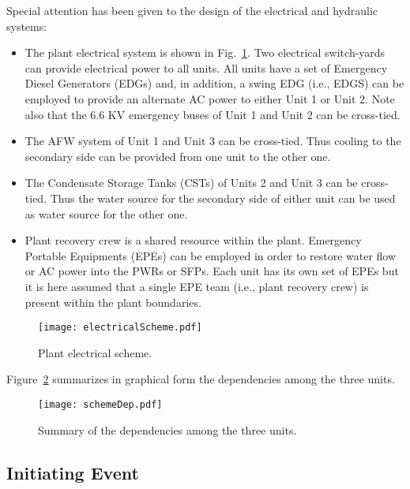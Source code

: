 Special attention has been given to the design of the electrical and hydraulic systems:
\begin{itemize}
  \item The plant electrical system is shown in Fig.~\ref{fig:electricalScheme}. Two 
        electrical switch-yards can provide electrical power to all units. All units 
        have a set of Emergency Diesel Generators (EDGs)  and, in addition, a swing 
        EDG (i.e., EDGS) can be employed to provide an alternate AC power to either
        Unit 1 or Unit 2. Note also that the 6.6 KV emergency buses of Unit 1 and 
        Unit 2 can be cross-tied.
  \item The AFW system of Unit 1 and Unit 3 can be cross-tied. 
        Thus cooling to the secondary side can be provided from one unit to the other one.
  \item The Condensate Storage Tanks (CSTs) of Units 2 and Unit 3 can be cross-tied. 
        Thus the water source  for the secondary side of either unit can be used as
        water source for the other one. 
  \item Plant recovery crew is a shared resource within the plant. Emergency Portable Equipments 
        (EPEs) can be employed in order
        to restore water flow or AC power into the PWRs or SFPs. Each unit has its own 
        set of EPEs but it is here assumed that a single EPE team (i.e., plant recovery 
        crew) is present within the plant boundaries.
\end{itemize}

\begin{figure}
    \centering
    \centerline{\texttt{[image: electricalScheme.pdf]}}
    \caption{Plant electrical scheme.}
    \label{fig:electricalScheme}
\end{figure}

Figure~\ref{fig:schemeDep} summarizes in graphical form the dependencies among the three units.

\begin{figure}
    \centering
    \centerline{\texttt{[image: schemeDep.pdf]}}
    \caption{Summary of the dependencies among the three units.}
    \label{fig:schemeDep}
\end{figure}

\subsection{Initiating Event}

